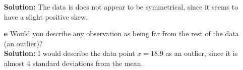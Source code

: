 \documentclass[12pt]{article}
\makeatletter
\theoremstyle{homework}
\newenvironment{exercise}[1]
{\def\@currentlabel{#1}\exercisecore}
{\endexercisecore}
\makeatother
\begin{document}
\begin{exercise}{1.14}
\begin{enumerate}
    \textbf{Solution:} The data is does not appear to be symmetrical, since it seems to have a slight positive skew.
    \vspace{.5in}


    \item[\textbf{e}] Would you describe any observation as being far from the rest of the data (an outlier)?\\
    
    \textbf{Solution:} I would describe the data point $x = 18.9$ as an outlier, since it is almost 4 standard deviations from the mean.  
    \vspace{.5in}
     

  \end{enumerate}
\end{exercise}
\vspace{1in}
\end{document}

